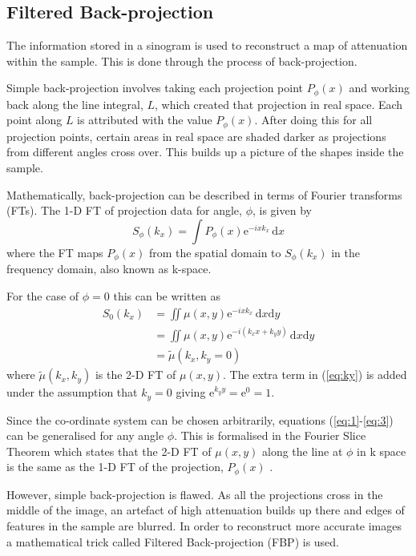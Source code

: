 \documentclass[12pt]{article}
\begin{document}
\subsection{Filtered Back-projection}
\label{subsec:FBP}

The information stored in a sinogram is used to reconstruct a map of attenuation within the sample. This is done through the process of back-projection.

Simple back-projection involves  taking each projection point $P_{\phi}(x)$ and working back along the line integral, $L$, which created that projection in real space. Each point along $L$ is  attributed with the value $P_{\phi}(x)$. After doing this for all projection points, certain areas in real space are shaded darker as projections from different angles cross over. This builds up a picture of the shapes inside the sample. 

Mathematically, back-projection can be described in terms of Fourier transforms (FTs). The 1-D FT of projection data for  angle, $\phi$, is given by
\begin{equation}
S_{\phi}(k_x) = \int P_{\phi}(x)\mathrm{e}^{-i x k_x}\, \mathrm{d}x
\end{equation}
where the FT maps $P_{\phi}(x)$ from the spatial domain to $S_{\phi}(k_x)$ in the frequency domain, also known as k-space.

For the case of $\phi = 0$ this can  be written as
\begin{align}
S_{0}(k_x) &= \iint \mu(x,y) \mathrm{e}^{-i x k_x }\, \mathrm{d}x\mathrm{d}y \label{eq:1}\\
  &= \iint \mu(x,y) \mathrm{e}^{-i(k_xx +k_yy)}\, \mathrm{d}x\mathrm{d}y \label{eq:ky} \\ 
  &= \tilde{\mu}(k_x,k_y=0) \label{eq:3}
\end{align}
where $\tilde{\mu}(k_x,k_y)$ is the 2-D FT of $\mu(x,y)$.
The extra term in (\ref{eq:ky}) is added  under the assumption that $k_y = 0$ giving $\mathrm{e}^{k_yy}=\mathrm{e}^{0}=1$. 

Since the co-ordinate system can be chosen arbitrarily, equations (\ref{eq:1}-\ref{eq:3}) can be generalised for any angle $\phi$.
This  is formalised in the Fourier Slice Theorem which states that the 2-D FT of $\mu(x,y)$ along the line at $\phi$ in k space is the same as the 1-D FT of the projection, $P_{\phi}(x)$ \cite{Doran:2008kh}.

However, simple back-projection is flawed. As all the projections cross in the middle of the image, an artefact of high attenuation builds up there and edges of features in the sample are blurred.  In order to reconstruct more accurate images a mathematical trick called Filtered Back-projection (FBP) is used. 
\end{document}
